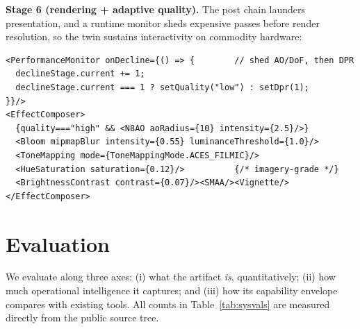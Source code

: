 \documentclass[conference]{IEEEtran}
\begin{document}
\textbf{Stage 6 (rendering + adaptive quality).} The post chain launders
presentation, and a runtime monitor sheds expensive passes before render
resolution, so the twin sustains interactivity on commodity hardware:
\begin{lstlisting}[caption={Post-processing and adaptive-quality rig (\texttt{src/components/site/SiteScene.tsx}).},label={lst:post}]
<PerformanceMonitor onDecline={() => {        // shed AO/DoF, then DPR
  declineStage.current += 1;
  declineStage.current === 1 ? setQuality("low") : setDpr(1);
}}/>
<EffectComposer>
  {quality==="high" && <N8AO aoRadius={10} intensity={2.5}/>}
  <Bloom mipmapBlur intensity={0.55} luminanceThreshold={1.0}/>
  <ToneMapping mode={ToneMappingMode.ACES_FILMIC}/>
  <HueSaturation saturation={0.12}/>          {/* imagery-grade */}
  <BrightnessContrast contrast={0.07}/><SMAA/><Vignette/>
</EffectComposer>
\end{lstlisting}

\section{Evaluation}
\label{sec:eval}
We evaluate along three axes: (i) what the artifact \emph{is}, quantitatively;
(ii) how much operational intelligence it captures; and (iii) how its capability
envelope compares with existing tools. All counts in
Table~\ref{tab:sysvals} are measured directly from the public source tree.
\end{document}
